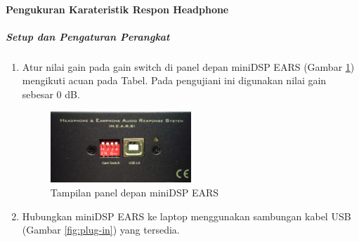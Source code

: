 \documentclass{article}
\renewcommand{\figurename}{Gambar}
\begin{document}
	\paragraph{Pengukuran Karateristik Respon Headphone}
	\subparagraph{Setup dan Pengaturan Perangkat}
	\label{setup}
	\begin{enumerate}
		\item Atur nilai gain pada gain switch di panel depan miniDSP EARS (Gambar \ref{fig:front-panel}) mengikuti acuan pada Tabel. Pada pengujiani ini digunakan nilai gain sebesar 0 dB.
		
		\begin{figure}[H]
			\renewcommand{\figurename}{Gambar}
			\centering
			\includegraphics[width=0.5\textwidth]{images/front-panel}
			\caption{Tampilan panel depan miniDSP EARS}
			\label{fig:front-panel}
		\end{figure}
		
		\item Hubungkan miniDSP EARS ke laptop menggunakan sambungan kabel USB (Gambar \ref{fig:plug-in}) yang tersedia.
		

\end{enumerate}
\end{document}
